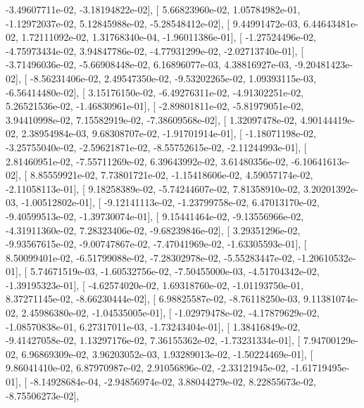 \documentclass{article}
\begin{document}
         -3.49607711e-02,  -3.18194822e-02],
       [  5.66823960e-02,   1.05784982e-01,  -1.12972037e-02,
          5.12845988e-02,  -5.28548412e-02],
       [  9.44991472e-03,   6.44643481e-02,   1.72111092e-02,
          1.31768340e-04,  -1.96011386e-01],
       [ -1.27524496e-02,  -4.75973434e-02,   3.94847786e-02,
         -4.77931299e-02,  -2.02713740e-01],
       [ -3.71496036e-02,  -5.66908448e-02,   6.16896077e-03,
          4.38816927e-03,  -9.20481423e-02],
       [ -8.56231406e-02,   2.49547350e-02,  -9.53202265e-02,
          1.09393115e-03,  -6.56414480e-02],
       [  3.15176150e-02,  -6.49276311e-02,  -4.91302251e-02,
          5.26521536e-02,  -1.46830961e-01],
       [ -2.89801811e-02,  -5.81979051e-02,   3.94410998e-02,
          7.15582919e-02,  -7.38609568e-02],
       [  1.32097478e-02,   4.90144419e-02,   2.38954984e-03,
          9.68308707e-02,  -1.91701914e-01],
       [ -1.18071198e-02,  -3.25755040e-02,  -2.59621871e-02,
         -8.55752615e-02,  -2.11244993e-01],
       [  2.81460951e-02,  -7.55711269e-02,   6.39643992e-02,
          3.61480356e-02,  -6.10641613e-02],
       [  8.85559921e-02,   7.73801721e-02,  -1.15418606e-02,
          4.59057174e-02,  -2.11058113e-01],
       [  9.18258389e-02,  -5.74244607e-02,   7.81358910e-02,
          3.20201392e-03,  -1.00512802e-01],
       [ -9.12141113e-02,  -1.23799758e-02,   6.47013170e-02,
         -9.40599513e-02,  -1.39730074e-01],
       [  9.15441464e-02,  -9.13556966e-02,  -4.31911360e-02,
          7.28323406e-02,  -9.68239846e-02],
       [  3.29351296e-02,  -9.93567615e-02,  -9.00747867e-02,
         -7.47041969e-02,  -1.63305593e-01],
       [  8.50099401e-02,  -6.51799088e-02,  -7.28302978e-02,
         -5.55283447e-02,  -1.20610532e-01],
       [  5.74671519e-03,  -1.60532756e-02,  -7.50455000e-03,
         -4.51704342e-02,  -1.39195323e-01],
       [ -4.62574020e-02,   1.69318760e-02,  -1.01193750e-01,
          8.37271145e-02,  -8.66230444e-02],
       [  6.98825587e-02,  -8.76118250e-03,   9.11381074e-02,
          2.45986380e-02,  -1.04535005e-01],
       [ -1.02979478e-02,  -4.17879629e-02,  -1.08570838e-01,
          6.27317011e-03,  -1.73243404e-01],
       [  1.38416849e-02,  -9.41427058e-02,   1.13297176e-02,
          7.36155362e-02,  -1.73231334e-01],
       [  7.94700129e-02,   6.96869309e-02,   3.96203052e-03,
          1.93289013e-02,  -1.50224469e-01],
       [  9.86041410e-02,   6.87970987e-02,   2.91056896e-02,
         -2.33121945e-02,  -1.61719495e-01],
       [ -8.14928684e-04,  -2.94856974e-02,   3.88044279e-02,
          8.22855673e-02,  -8.75506273e-02],
\end{document}
